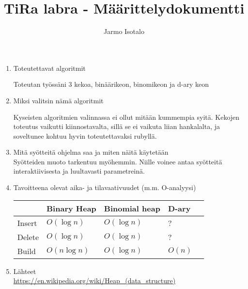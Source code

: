 \documentclass[a4paper,12pt]{article}
\begin{document}
\title{TiRa labra - Määrittelydokumentti} 
\author{Jarmo Isotalo}
\maketitle
\begin{enumerate}
\item Toteutettavat algoritmit

Toteutan työssäni 3 kekoa, binäärikeon, binomikeon ja d-ary keon

\item Miksi valitsin nämä algoritmit

Kyseisten algoritmien valinnassa ei ollut mitään kummempia syitä. Kekojen toteutus vaikutti
kiinnostavalta, sillä se ei vaikuta liian hankalalta, ja soveltunee kohtuu hyvin toteutettavaksi rubyllä.

\item Mitä syötteitä ohjelma saa ja miten näitä käytetään\\
Syötteiden muoto tarkentuu myöhemmin. 
Niille voinee antaa syötteitä interaktiivisesta ja luultavasti parametreinä.

\item Tavoitteena olevat aika- ja tilavaativuudet (m.m. O-analyysi)

\begin{tabular}{|l|l|l|l|l|}
\hline
&Binary Heap & Binomial heap & D-ary \\\hline
Insert & $O (\log n)$ & $O (\log n)$ & ?\\\hline
Delete  & $O (\log n)$ & $O (\log n)$ & ?\\\hline
Build & $O (n \log n)$ & $O (\log n)$ & $O (n)$\\\hline
\end{tabular}

\item Lähteet\\
\url{https://en.wikipedia.org/wiki/Heap_(data_structure)}
\end{enumerate}
\end{document}
